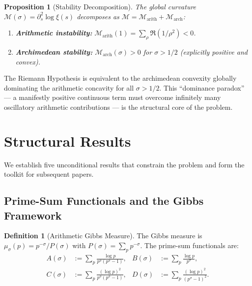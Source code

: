 \documentclass[12pt,a4paper]{article}
\newtheorem{proposition}[theorem]{Proposition}
\theoremstyle{definition}
\newtheorem{definition}[theorem]{Definition}
\theoremstyle{remark}
\newcommand{\muG}{\mu_\sigma}
\begin{document}
\begin{proposition}[Stability Decomposition]
\label{prop:stability}
The global curvature $\mathcal{M}(\sigma) = \partial_s^2\log\xi(s)$ decomposes as $\mathcal{M} = \mathcal{M}_{\mathrm{arith}} + \mathcal{M}_{\mathrm{arch}}$:
\begin{enumerate}
  \item \textbf{Arithmetic instability:} $\mathcal{M}_{\mathrm{arith}}(1) = \sum_\rho \Re(1/\rho^2) < 0$.
  \item \textbf{Archimedean stability:} $\mathcal{M}_{\mathrm{arch}}(\sigma) > 0$ for $\sigma > 1/2$ (explicitly positive and convex).
\end{enumerate}
\end{proposition}

\noindent The Riemann Hypothesis is equivalent to the archimedean convexity globally dominating the arithmetic concavity for all $\sigma > 1/2$. This ``dominance paradox'' --- a manifestly positive continuous term must overcome infinitely many oscillatory arithmetic contributions --- is the structural core of the problem.


\section{Structural Results}
\label{sec:structural}

We establish five unconditional results that constrain the problem and form the toolkit for subsequent papers.

\subsection{Prime-Sum Functionals and the Gibbs Framework}

\begin{definition}[Arithmetic Gibbs Measure]
The Gibbs measure is $\muG(p) = p^{-\sigma}/P(\sigma)$ with $P(\sigma) = \sum_p p^{-\sigma}$. The prime-sum functionals are:
\begin{align*}
A(\sigma) &:= \sum_p \frac{\log p}{p^\sigma(p^\sigma - 1)}, &
B(\sigma) &:= \sum_p \frac{\log p}{p^\sigma},\\
C(\sigma) &:= \sum_p \frac{(\log p)^2}{p^\sigma(p^\sigma - 1)}, &
D(\sigma) &:= \sum_p \frac{(\log p)^2}{(p^\sigma - 1)^2}.
\end{align*}
\end{definition}
\end{document}
